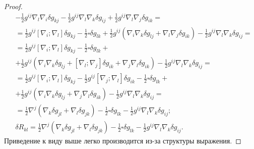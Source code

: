 \documentclass[a4paper, 14pt]{scrarticle}
\theoremstyle{Imperial}
\begin{document}
\begin{proof}
$$\begin{aligned}
			&-\frac{1}{2}g^{ij}\nabla_{l}\nabla_{i}\delta g_{kj}-\frac{1}{2}g^{ij}\nabla_{l}\nabla_{k}\delta g_{ij}+\frac{1}{2}g^{ij}\nabla_{l}\nabla_{j}\delta g_{ik}=\\
			&=\frac{1}{2}g^{ij}\left[\nabla_{i};\nabla_{l}\right]\delta g_{kj}-\frac{1}{2}\square\delta g_{lk}+\frac{1}{2}g^{ij}\left(\nabla_{i}\nabla_{k}\delta g_{lj}+\nabla_{l}\nabla_{j}\delta g_{ik}\right)-\frac{1}{2}g^{ij}\nabla_{l}\nabla_{k}\delta g_{ij}=\\
			&=\frac{1}{2}g^{ij}\left[\nabla_{i};\nabla_{l}\right]\delta g_{kj}-\frac{1}{2}\square\delta g_{lk}+\\
			&+\frac{1}{2}g^{ij}\left(\nabla_{i}\nabla_{k}\delta g_{lj}+\left[\nabla_{l};\nabla_{j}\right]\delta g_{ik}+\nabla_{j}\nabla_{l}\delta g_{ik}\right)-\frac{1}{2}g^{ij}\nabla_{l}\nabla_{k}\delta g_{ij}=\\
			&=\frac{1}{2}g^{ij}\left[\nabla_{i};\nabla_{l}\right]\delta g_{kj}-\frac{1}{2}g^{ij}\left[\nabla_{j};\nabla_{l}\right]\delta g_{ik}-\frac{1}{2}\square\delta g_{lk}+\\
			&+\frac{1}{2}g^{ij}\left(\nabla_{i}\nabla_{k}\delta g_{lj}+\nabla_{j}\nabla_{l}\delta g_{ik}\right)-\frac{1}{2}g^{ij}\nabla_{l}\nabla_{k}\delta g_{ij}=\\
			&=\frac{1}{2}\nabla^{j}\left(\nabla_{k}\delta g_{jl}+\nabla_{l}\delta g_{jk}\right)-\frac{1}{2}\square\delta g_{lk}-\frac{1}{2}g^{ij}\nabla_{l}\nabla_{k}\delta g_{ij};\\
			&\delta R_{kl}=\frac{1}{2}\nabla^{j}\left(\nabla_{k}\delta g_{jl}+\nabla_{l}\delta g_{jk}\right)-\frac{1}{2}\square\delta g_{lk}-\frac{1}{2}g^{ij}\nabla_{l}\nabla_{k}\delta g_{ij}.
		\end{aligned}$$
		Приведение к виду выше легко производится из-за структуры выражения.
	\end{proof}
	
\end{document}
